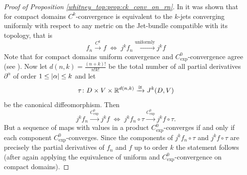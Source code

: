 \begin{proof}[Proof of Proposition \ref{whitney_top:prop:ck_conv_on_rn}]
    In \cite{golubitsky2012stable} it was shown that for compact domains $C^k$-convergence is equivalent to the $k$-jets converging uniformly with respect to any metric on the Jet-bundle compatible with its topology, that is 
    \[
    f_n \xrightarrow{C^k} f \; \Leftrightarrow \; j^kf_n \xrightarrow{\mathrm{uniformly}} j^kf
    \]
    Note that for compact domains uniform convergence and $C^0_\mathrm{exp}$-convergence agree (see \cite{steimle_topo}). Now let $d(n,k) = \frac{(n+k)!}{n!k!}$ be the total number of all partial derivatives $\partial^\alpha$ of order $1 \leq \lvert\alpha\rvert \leq k$ and let 
    \[
    \tau \colon D \times V \times \mathbb{R}^{d(n,k)} \xrightarrow{\cong} J^k(D,V)
    \]
    be the canonical diffeomorphism. Then 
    \[
    j^kf_n \xrightarrow{C^0_\mathrm{exp}} j^kf \; \Leftrightarrow \; j^kf_n \circ \tau \xrightarrow{C^0_\mathrm{exp}} j^kf \circ \tau.
    \]
    But a sequence of maps with values in a product $C^0_\mathrm{exp}$-converges if and only if each component $C^0_\mathrm{exp}$-converges. Since the components of $j^kf_n \circ \tau$ and $j^kf \circ \tau$ are precisely the partial derivatives of $f_n$ and $f$ up to order $k$ the statement follows (after again applying the equivalence of uniform and $C^0_\mathrm{exp}$-convergence on compact domains).
\end{proof}

